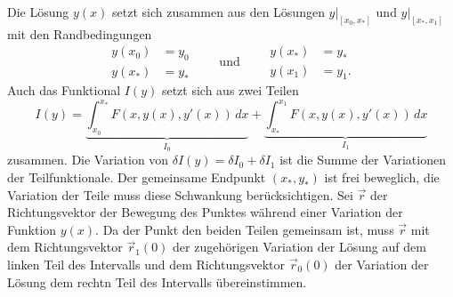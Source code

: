 Die Lösung $y(x)$ setzt sich zusammen aus den Lösungen $y|_{[x_0,x_*]}$
und $y|_{[x_*,x_1]}$ mit den Randbedingungen
\begin{equation*}
\begin{aligned}
y(x_0)&=y_0\\
y(x_*)&=y_*
\end{aligned}
\qquad\text{und}\qquad
\begin{aligned}
y(x_*)&=y_*\\
y(x_1)&=y_1.
\end{aligned}
\end{equation*}
Auch das Funktional $I(y)$ setzt sich aus zwei Teilen
\[
I(y)
=
\underbrace{
\int_{x_0}^{x_*}
F(x,y(x),y'(x))
\,dx
}_{\displaystyle I_0}
+
\underbrace{
\int_{x_*}^{x_1}
F(x,y(x),y'(x))
\,dx
}_{\displaystyle I_1}
\]
zusammen.
Die Variation von $\delta I(y)=\delta I_0+\delta I_1$ ist die Summe 
der Variationen der Teilfunktionale.
Der gemeinsame Endpunkt $(x_*,y_*)$ ist frei beweglich,
die Variation der Teile muss diese Schwankung berücksichtigen.
Sei $\vec{r}$ der Richtungsvektor der Bewegung des Punktes während
einer Variation der Funktion $y(x)$.
Da der Punkt den beiden Teilen gemeinsam ist, muss $\vec{r}$
mit dem Richtungsvektor $\vec{r}_1(0)$ der zugehörigen Variation
der Lösung auf dem linken Teil des Intervalls und dem
Richtungsvektor $\vec{r}_0(0)$ der Variation der Lösung dem rechtn Teil
des Intervalls übereinstimmen.


